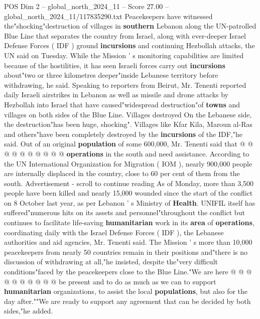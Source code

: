 \begin{textsample}{POS Dim 2 – global\_north\_2024\_11 – Score 27.00 – global\_north\_2024\_11/117835290.txt}  \label{ex:f2_pos_356}
Peacekeepers have witnessed the"shocking"destruction of villages in \textbf{southern} Lebanon along the UN-patrolled Blue Line that separates the country from Israel, along with ever-deeper Israel Defense Forces ( IDF ) ground \textbf{incursions} and continuing Hezbollah attacks, the UN said on Tuesday.
While the Mission ' s monitoring capabilities are limited because of the hostilities, it has seen Israeli forces carry out \textbf{incursions} about"two or three kilometres deeper"inside Lebanese territory before withdrawing, he said.
Speaking to reporters from Beirut, Mr.
Tenenti reported daily Israeli airstrikes in Lebanon as well as missile and drone attacks by Hezbollah into Israel that have caused"widespread destruction"of \textbf{towns} and villages on both sides of the Blue Line.
Villages destroyed On the Lebanese side, the destruction"has been huge, shocking".
Villages like Kfar Kila, Maroun al-Ras and others"have been completely destroyed by the \textbf{incursions} of the IDF,"he said.
Out of an original \textbf{population} of some 600,000, Mr.
Tenenti said that @ @ @ @ @ @ @ @ @ @ \textbf{operations} in the south and need assistance.
According to the UN International Organization for Migration ( IOM ), nearly 900,000 people are internally displaced in the country, close to 60 per cent of them from the south.
Advertisement - scroll to continue reading As of Monday, more than 3,500 people have been killed and nearly 15,000 wounded since the start of the conflict on 8 October last year, as per Lebanon ' s Ministry of \textbf{Health}.
UNIFIL itself has suffered"numerous hits on its assets and personnel"throughout the conflict but continues to facilitate life-saving \textbf{humanitarian} work in its \textbf{area} of \textbf{operations}, coordinating daily with the Israel Defense Forces ( IDF ), the Lebanese authorities and aid agencies, Mr.
Tenenti said.
The Mission ' s more than 10,000 peacekeepers from nearly 50 countries remain in their positions and"there is no discussion of withdrawing at all,"he insisted, despite the"very difficult conditions"faced by the peacekeepers close to the Blue Line."We are here @ @ @ @ @ @ @ @ @ @ be present and to do as much as we can to support \textbf{humanitarian} organizations, to assist the local \textbf{populations}, but also for the day after.""We are ready to support any agreement that can be decided by both sides,"he added.

\end{textsample}

